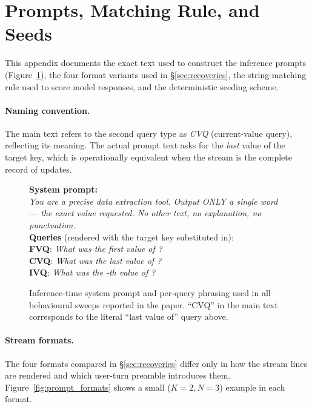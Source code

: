 \documentclass[11pt]{article}
\begin{document}
\section{Prompts, Matching Rule, and Seeds}
\label{app:prompts}

This appendix documents the exact text used to construct the
inference prompts (Figure~\ref{fig:prompt_system}), the four format variants used in
\S\ref{sec:recoveries}, the string-matching rule used to score model
responses, and the deterministic seeding scheme.

\paragraph{Naming convention.}
The main text refers to the second query type as \emph{CVQ}
(current-value query), reflecting its meaning. The actual prompt
text asks for the \emph{last} value of the target key, which is
operationally equivalent when the stream is the complete record of
updates.

\begin{figure}[h]
\small
\centering
\begin{tcolorbox}[
    colframe=black!30, colback=gray!4,
    boxrule=0.5pt, arc=2pt,
    left=6pt, right=6pt, top=4pt, bottom=4pt,
    title={\textbf{System prompt and queries}},
    fonttitle=\small\bfseries,
    coltitle=black]
\textbf{System prompt:}\\[1pt]
\emph{You are a precise data extraction tool. Output ONLY a single
word --- the exact value requested. No other text, no explanation,
no punctuation.}\\[6pt]
\textbf{Queries} (rendered with the target key substituted in):\\[1pt]
\textbf{FVQ}: \emph{What was the first value of {\sc[target]}?}\\
\textbf{CVQ}: \emph{What was the last value of {\sc[target]}?}\\
\textbf{IVQ}: \emph{What was the {\sc[k]}-th value of
{\sc[target]}?}
\end{tcolorbox}
\caption{Inference-time system prompt and per-query phrasing used in
all behavioural sweeps reported in the paper. ``CVQ'' in the main
text corresponds to the literal ``last value of'' query above.}
\label{fig:prompt_system}
\end{figure}

\paragraph{Stream formats.}
The four formats compared in \S\ref{sec:recoveries} differ only in
how the stream lines are rendered and which user-turn preamble
introduces them. Figure~\ref{fig:prompt_formats} shows a small
($K{=}2, N{=}3$) example in each format.
\end{document}
